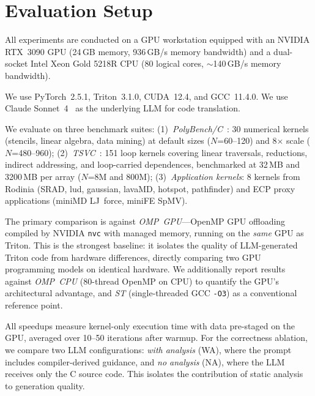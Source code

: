 
\section{Evaluation Setup}

All experiments are conducted on a GPU workstation equipped with an NVIDIA RTX~3090 GPU (24\,GB memory, 936\,GB/s memory bandwidth) and a dual-socket Intel Xeon Gold 5218R CPU (80 logical cores, $\sim$140\,GB/s memory bandwidth).

We use PyTorch~2.5.1, Triton~3.1.0, CUDA~12.4, and GCC~11.4.0. We use Claude Sonnet~4~\cite{anthropic2025claude} as the underlying LLM for code translation.

We evaluate on three benchmark suites:
(1)~\emph{PolyBench/C}~\cite{polybench}: 30 numerical kernels (stencils, linear algebra, data mining) at default sizes ($N$=60--120) and 8$\times$ scale ($N$=480--960);
(2)~\emph{TSVC}~\cite{callahan1988tsvc}: 151 loop kernels covering linear traversals, reductions, indirect addressing, and loop-carried dependences, benchmarked at 32\,MB and 3200\,MB per array ($N$=8M and 800M);
(3)~\emph{Application kernels}: 8 kernels from Rodinia (SRAD, lud, gaussian, lavaMD, hotspot, pathfinder) and ECP proxy applications (miniMD LJ~force, miniFE SpMV).

The primary comparison is against \emph{OMP~GPU}---OpenMP GPU offloading compiled by NVIDIA \texttt{nvc} with managed memory, running on the \emph{same} GPU as Triton.
This is the strongest baseline: it isolates the quality of LLM-generated Triton code from hardware differences, directly comparing two GPU programming models on identical hardware.
We additionally report results against \emph{OMP~CPU} (80-thread OpenMP on CPU) to quantify the GPU's architectural advantage, and \emph{ST} (single-threaded GCC \texttt{-O3}) as a conventional reference point.

All speedups measure kernel-only execution time with data pre-staged on the GPU, averaged over 10--50 iterations after warmup.
For the correctness ablation, we compare two LLM configurations: \emph{with analysis} (WA), where the prompt includes compiler-derived guidance, and \emph{no analysis} (NA), where the LLM receives only the C source code. This isolates the contribution of static analysis to generation quality.